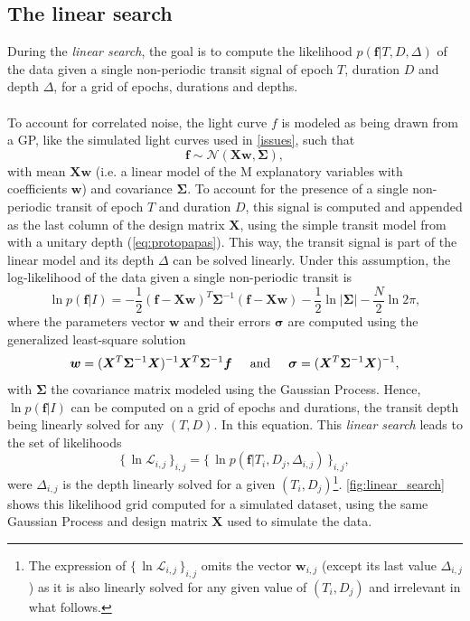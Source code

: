 \documentclass[modern]{aastex631}
\newcommand{\set}[1]{\{\,#1\,\}}
\begin{document}
\subsection{The linear search}\label{linear_search}

During the \textit{linear search}, the goal is to compute the likelihood $p(\bm{f} \vert T , D, \Delta)$ of the data given a single non-periodic transit signal of epoch $T$, duration $D$ and depth $\Delta$, for a grid of epochs, durations and depths.
\\\\
To account for correlated noise, the light curve $f$ is modeled as being drawn from a GP, like the simulated light curves used in \autoref{issues}, such that
\begin{equation*}
    \bm{f} \sim \mathcal{N}(\bm{X w}, \bm{\Sigma}),
\end{equation*}
with mean $\bm{Xw}$ (i.e. a linear model of the M explanatory variables with coefficients $\bm{w}$) and covariance $\bm{\Sigma}$. To account for the presence of a single non-periodic transit of epoch $T$ and duration $D$, this signal is computed and appended as the last column of the design matrix $\bm{X}$, using the simple transit model from \cite{protopapas} with a unitary depth (\autoref{eq:protopapas}). This way, the transit signal is part of the linear model and its depth $\Delta$ can be solved linearly. Under this assumption, the log-likelihood of the data given a single non-periodic transit is \citep{Rasmussen2005}
\begin{equation} \label{eq:linear_search_ll}
    \ln p(\bm{f} \vert I) = -\frac{1}{2}(\bm{f}-\bm{Xw})^T\bm{\Sigma}^{-1}(\bm{f}-\bm{Xw}) -  \frac{1}{2}\ln\vert\bm{\Sigma}\vert - \frac{N}{2}\ln 2\pi,
\end{equation}
where the parameters vector $\bm{w}$ and their errors $\bm{\sigma}$ are computed using the generalized least-square solution
\begin{equation}\label{eq:ls}
    \bm{w} = (\bm{X}^T\bm{\Sigma}^{-1}\bm{X})^{-1}\bm{X}^T\bm{\Sigma}^{-1}\bm{f} \hspace{0.5cm} \text{and} \hspace{0.5cm} \bm{\sigma} = (\bm{X}^T\bm{\Sigma}^{-1}\bm{X})^{-1},
\end{equation} 
with $\bm{\Sigma}$ the covariance matrix modeled using the Gaussian Process. Hence, $\ln p(\bm{f} \vert I)$ can be computed on a grid of epochs and durations, the transit depth being linearly solved for any $(T, D)$. In this equation. This \textit{linear search} leads to the set of likelihoods
\begin{equation*}
    \set{\ln\mathcal{L}_{i,j}}_{i, j} = \set{\ln p(\bm{f} \vert T_i ,D_j, \Delta_{i,j})}_{i, j},
\end{equation*}
were $\Delta_{i,j}$ is the depth linearly solved for a given $(T_i, D_j)$\footnote{The expression of $\set{\ln\mathcal{L}_{i,j}}_{i, j}$ omits the vector $\bm{w}_{i,j}$ (except its last value $\Delta_{i,j}$) as it is also linearly solved for any given value of $(T_i, D_j)$ and irrelevant in what follows.}. \autoref{fig:linear_search} shows this likelihood grid computed for a simulated dataset, using the same Gaussian Process  and design matrix $\bm{X}$ used to simulate the data.
\end{document}

